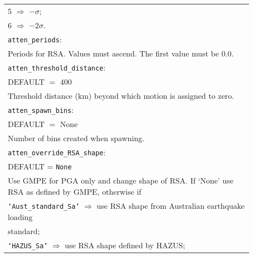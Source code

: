 \begin{tabular}{|p{\textwidth}|}
 \hspace{0.5em} 5 $\Rightarrow$ $-\sigma$; \\
 \hspace{0.5em} 6 $\Rightarrow$ $-2\sigma$.\\
\hline \vspace{0.1em} \texttt{atten\_periods}: \\
Periods for RSA. Values must ascend. The first value must be 0.0.\\
\vspace{0.1em} \texttt{atten\_threshold\_distance}: \\
DEFAULT $=$ 400 \\
Threshold distance (km) beyond which motion is assigned to zero. \\
\vspace{0.1em} \texttt{atten\_spawn\_bins}: \\
DEFAULT $=$ None \\
Number of bins created when spawning. \\
\hline \vspace{0.1em} \texttt{atten\_override\_RSA\_shape}: \\
DEFAULT = \texttt{None} \\
Use GMPE for PGA only and change shape of RSA. If `None' use RSA
as defined by GMPE, otherwise if\\
 \hspace{0.5em} \texttt{`Aust\_standard\_Sa'} $\Rightarrow$
use RSA shape from Australian earthquake loading \\
\hspace{11em} standard; \\
 \hspace{0.5em} \texttt{`HAZUS\_Sa'}  $\Rightarrow$ use RSA shape defined by HAZUS;\\
\hline
\end{tabular}

